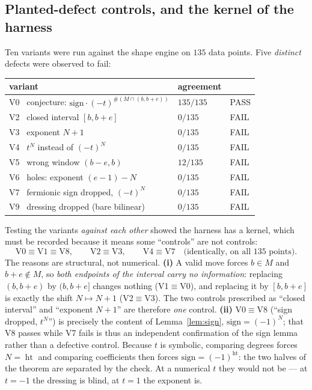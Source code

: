 \documentclass[11pt]{article}
\theoremstyle{definition}
\newcommand{\hgt}{\operatorname{ht}}          %
\begin{document}
\subsection*{Planted-defect controls, and the kernel of the harness}
Ten variants were run against the shape engine on $135$ data points.  Five
\emph{distinct} defects were observed to fail:
\begin{center}
\begin{tabular}{lll}
\hline
variant & agreement & \\
\hline
V0 \ conjecture: $\mathrm{sign}\cdot(-t)^{\#(M\cap(b,b+e))}$ & $135/135$ & PASS\\
V2 \ closed interval $[b,b+e]$ & $0/135$ & FAIL\\
V3 \ exponent $N+1$ & $0/135$ & FAIL\\
V4 \ $t^{N}$ instead of $(-t)^{N}$ & $0/135$ & FAIL\\
V5 \ wrong window $(b-e,b)$ & $12/135$ & FAIL\\
V6 \ holes: exponent $(e-1)-N$ & $0/135$ & FAIL\\
V7 \ fermionic sign dropped, $(-t)^{N}$ & $0/135$ & FAIL\\
V9 \ dressing dropped (bare bilinear) & $0/135$ & FAIL\\
\hline
\end{tabular}
\end{center}
Testing the variants \emph{against each other} showed the harness has a kernel,
which must be recorded because it means some ``controls'' are not controls:
\[
  \text{V0}\equiv\text{V1}\equiv\text{V8},\qquad
  \text{V2}\equiv\text{V3},\qquad
  \text{V4}\equiv\text{V7}\quad\text{(identically, on all }135\text{ points)}.
\]
The reasons are structural, not numerical.  \textbf{(i)} A valid move forces
$b\in M$ and $b+e\notin M$, so \emph{both endpoints of the interval carry no
information}: replacing $(b,b+e)$ by $(b,b+e]$ changes nothing (V1$\equiv$V0), and
replacing it by $[b,b+e]$ is exactly the shift $N\mapsto N+1$ (V2$\equiv$V3).  The
two controls prescribed as ``closed interval'' and ``exponent $N+1$'' are therefore
\emph{one} control.  \textbf{(ii)} V0$\equiv$V8 (``sign dropped, $t^{N}$'') is
precisely the content of Lemma~\ref{lem:sign}, $\mathrm{sign}=(-1)^{N}$; that V8
passes while V7 fails is thus an independent confirmation of the sign lemma rather
than a defective control.  Because $t$ is symbolic, comparing degrees forces
$N=\hgt$ and comparing coefficients then forces $\mathrm{sign}=(-1)^{\hgt}$: the
two halves of the theorem are separated by the check.  At a numerical $t$ they
would not be --- at $t=-1$ the dressing is blind, at $t=1$ the exponent is.
\end{document}
